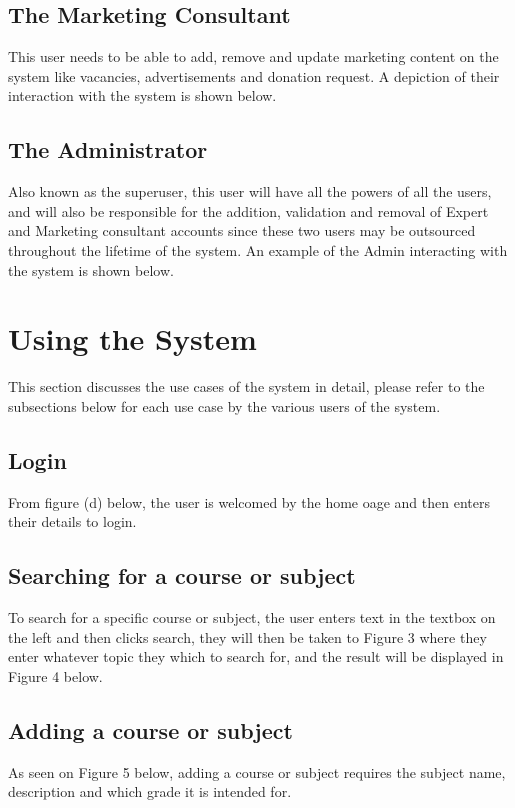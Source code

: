 \documentclass[12pt,a4paper]{article}
\begin{document}
		\subsection{The Marketing Consultant}
		 This user needs to be able to add, remove and update marketing content on the system like vacancies, advertisements and donation request. A depiction of their interaction with the system is shown below.
		 
		 
		 \subsection{The Administrator}
		 Also known as the superuser, this user will have all the powers of all the users, and will also be responsible for the addition, validation and removal of Expert and Marketing consultant accounts since these two users may be outsourced throughout the lifetime of the system. An example of the Admin interacting with the system is shown below.
		 
	\section{Using the System}
	 This section discusses the use cases of the system in detail, please refer to the subsections below for each use case by the various users of the system.
	 	\subsection{Login}
	 	 From figure (d) below, the user is welcomed by the home oage and then enters their details to login.
	 	 
	 	 \subsection{Searching for a course or subject}
	 	 To search for a specific course or subject, the user enters text in the textbox on the left and then clicks search, they will then be taken to Figure 3 where they enter whatever topic they which to search for, and the result will be displayed in Figure 4 below.
	 	 
	 	 
	 	 
	 	 \subsection{Adding a course or subject}
		 As seen on Figure 5 below, adding a course or subject requires the subject name, description and which grade it is intended for. 
		 
\end{document}
